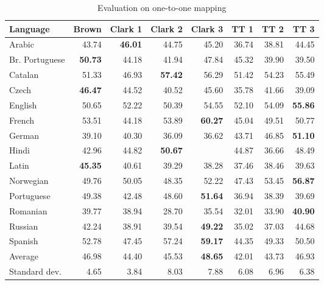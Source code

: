 \documentclass[11pt]{article}
\begin{document}
{\begin{table}
\scriptsize
\centering
\begin{tabular}{l|r|r|r|r|r|r|r}
\bf Language & \bf Brown & \bf Clark 1& \bf Clark 2 & \bf Clark 3 & \bf TT 1 & \bf TT 2 & \bf TT 3 \\
\hline
Arabic & 43.74 & \bf 46.01 & 44.75 & 45.20 & 36.74 & 38.81 & 44.45 \\
Br. Portuguese & \bf 50.73 & 44.18 & 41.94 & 47.84 & 45.32 & 39.90 & 39.50 \\
Catalan & 51.33 & 46.93 & \bf 57.42 & 56.29 & 51.42 & 54.23 & 55.49 \\
Czech & \bf 46.47 & 44.52 & 40.52 & 45.60 & 35.78 & 41.66 & 39.09 \\
English & 50.65 & 52.22 & 50.39 & 54.55 & 52.10 & 54.09 & \bf 55.86 \\
French & 53.51 & 44.18 & 53.89 & \bf 60.27 & 45.04 & 49.51 & 50.77 \\
German & 39.10 & 40.30 & 36.09 & 36.62 & 43.71 & 46.85 & \bf 51.10 \\
Hindi & 42.96 & 44.82 & \bf 50.67 &  & 44.87 & 36.66 & 48.49 \\
Latin & \bf 45.35 & 40.61 & 39.29 & 38.28 & 37.46 & 38.46 & 39.63 \\
Norwegian & 49.76 & 50.05 & 48.35 & 52.22 & 47.43 & 53.45 & \bf 56.87 \\
Portuguese & 49.38 & 42.48 & 48.60 & \bf 51.64 & 36.94 & 38.39 & 39.69 \\
Romanian & 39.77 & 38.94 & 28.70 & 35.54 & 32.01 & 33.90 & \bf 40.90 \\
Russian & 42.24 & 38.91 & 39.54 & \bf 49.22 & 35.02 & 37.03 & 44.68 \\
Spanish & 52.78 & 47.45 & 57.24 & \bf 59.17 & 44.35 & 49.33 & 50.50 \\
\hline
Average & 46.98 & 44.40 & 45.53 & \bf 48.65 & 42.01 & 43.73 & 46.93 \\
Standard dev. & 4.65 & 3.84 & 8.03 & 7.88 & 6.08 & 6.96 & 6.38 \\

\end{tabular}
\caption{Evaluation on one-to-one mapping}
\label{one-to-one}
\end{table}

}
\end{document}
